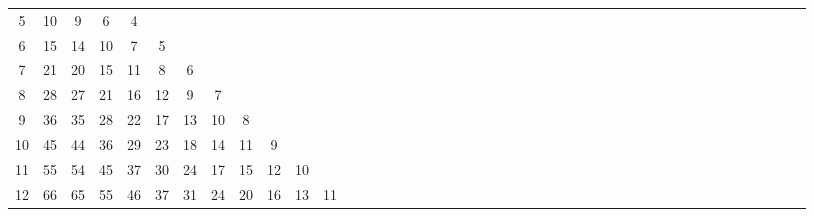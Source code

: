 \documentclass[12pt,a4paper]{amsart}
\theoremstyle{definition} %
\theoremstyle{plain} %
\begin{document}
\begin{table}[h]
{\begin{tabular}{|c|*{44}{c|}}
            5 &  10 &   9 &   6 &   4 &     &     &     &     &     &      &      &      &      &      &      &      &      &      &      &      &      &      &      &      &      &      &      &      &      &      &      &      &      &      &      &      &      &      &      &      &      &      &      &      \\
            6 &  15 &  14 &  10 &   7 &   5 &     &     &     &     &      &      &      &      &      &      &      &      &      &      &      &      &      &      &      &      &      &      &      &      &      &      &      &      &      &      &      &      &      &      &      &      &      &      &      \\
            7 &  21 &  20 &  15 &  11 &   8 &   6 &     &     &     &      &      &      &      &      &      &      &      &      &      &      &      &      &      &      &      &      &      &      &      &      &      &      &      &      &      &      &      &      &      &      &      &      &      &      \\
            8 &  28 &  27 &  21 &  16 &  12 &   9 &   7 &     &     &      &      &      &      &      &      &      &      &      &      &      &      &      &      &      &      &      &      &      &      &      &      &      &      &      &      &      &      &      &      &      &      &      &      &      \\
            9 &  36 &  35 &  28 &  22 &  17 &  13 &  10 &   8 &     &      &      &      &      &      &      &      &      &      &      &      &      &      &      &      &      &      &      &      &      &      &      &      &      &      &      &      &      &      &      &      &      &      &      &      \\
            10 &  45 &  44 &  36 &  29 &  23 &  18 &  14 &  11 &   9 &      &      &      &      &      &      &      &      &      &      &      &      &      &      &      &      &      &      &      &      &      &      &      &      &      &      &      &      &      &      &      &      &      &      &      \\
            11 &  55 &  54 &  45 &  37 &  30 &  24 &  17 &  15 &  12 &   10 &      &      &      &      &      &      &      &      &      &      &      &      &      &      &      &      &      &      &      &      &      &      &      &      &      &      &      &      &      &      &      &      &      &      \\
            12 &  66 &  65 &  55 &  46 &  37 &  31 &  24 &  20 &  16 &   13 &   11 &      &      &      &      &      &      &      &      &      &      &      &      &      &      &      &      &      &      &      &      &      &      &      &      &      &      &      &      &      &      &      &      &      \\

\end{tabular}}
\end{table}
\end{document}

